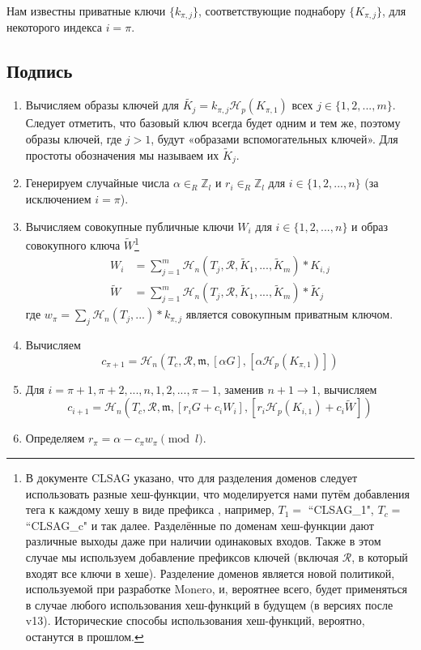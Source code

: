Нам известны приватные ключи \(\{k_{\pi, j}\}\), соответствующие поднабору \(\{K_{\pi, j}\}\), для некоторого индекса \(i = \pi\).


\subsection*{Подпись}

\begin{enumerate}
	\item Вычисляем образы ключей для \(\tilde{K_j} = k_{\pi, j} \mathcal{H}_p(K_{\pi, 1})\) всех \(j \in \{1, 2, ..., m\}\). Следует отме\-тить, что базовый ключ всегда будет одним и тем же, поэтому образы ключей, где $j>1$, будут «образами вспомогательных ключей». Для простоты обозначения мы называем их $\tilde{K}_j$.

	\item Генерируем случайные числа  \(\alpha \in_R \mathbb{Z}_l\) и \(r_{i} \in_R \mathbb{Z}_l\) для \(i \in \{1, 2, ..., n\}\) (за исключением \(i = \pi\)).

    \item Вычисляем совокупные публичные ключи $W_i$ для \(i \in \{1, 2, ..., n\}\) и образ совокупного ключа $\tilde{W}$\footnote{В документе CLSAG указано, что для разделения доменов следует использовать  разные хеш-функции, что моделируется нами путём добавления тега к каждому хешу в виде префикса \cite{MRL-0011-CLSAG}, например, $T_1 =$ ``CLSAG\_1", $T_c =$ ``CLSAG\_c" и так далее. Разделённые по доменам хеш-функции дают различные выходы даже при наличии одинаковых входов. Также в этом случае мы используем добавление префиксов ключей (включая $\mathcal{R}$, в который входят все ключи в хеше). Разделение доменов является новой политикой, используемой при разработке Monero, и, вероятнее всего, будет применяться в случае любого использования хеш-функций в будущем (в версиях после v13). Исторические способы использования хеш-функций, вероятно, останутся в прошлом.}%
    \begin{align*}
    W_i &= \sum^{m}_{j=1} \mathcal{H}_n(T_j, \mathcal{R}, \tilde{K}_1,...,\tilde{K}_{m})*K_{i,j}\\
    \tilde{W} &= \sum^{m}_{j=1} \mathcal{H}_n(T_j, \mathcal{R}, \tilde{K}_1,...,\tilde{K}_{m})*\tilde{K}_j
    \end{align*}{}
    где $w_{\pi} = \sum_j \mathcal{H}_n(T_j,...)*k_{\pi,j}$ является совокупным приватным ключом.

	\item Вычисляем
	\[c_{\pi+1} = \mathcal{H}_n(T_c, \mathcal{R}, \mathfrak{m}, [\alpha G], [\alpha \mathcal{H}_p(K_{\pi, 1})])\]

	\item Для \(i = \pi+1, \pi+2, ..., n, 1, 2, ..., \pi-1\), заменив \(n + 1 \rightarrow 1\), вычисляем\vspace{.175cm}
	\[c_{i+1} = \mathcal{H}_n(T_c, \mathcal{R}, \mathfrak{m}, [r_i G + c_i W_i], [r_{i} \mathcal{H}_p(K_{i,1}) + c_i \tilde{W}])\]

	\item Определяем \(r_{\pi} = \alpha - c_\pi w_\pi \pmod l\).
\end{enumerate}

